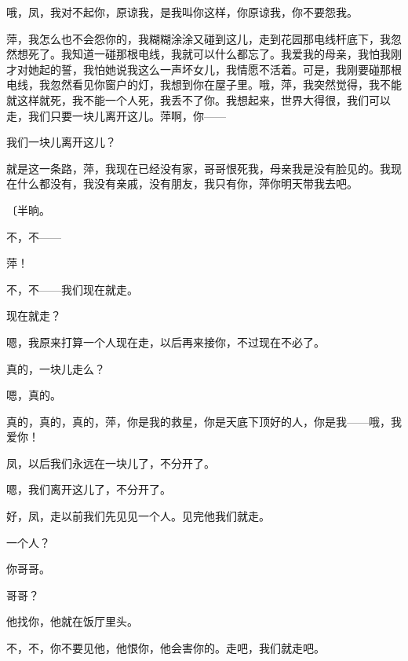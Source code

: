 哦，凤，我对不起你，原谅我，是我叫你这样，你原谅我，你不要怨我。

萍，我怎么也不会怨你的，我糊糊涂涂又碰到这儿，走到花园那电线杆底下，我忽然想死了。我知道一碰那根电线，我就可以什么都忘了。我爱我的母亲，我怕我刚才对她起的誓，我怕她说我这么一声坏女儿，我情愿不活着。可是，我刚要碰那根电线，我忽然看见你窗户的灯，我想到你在屋子里。哦，萍，我突然觉得，我不能就这样就死，我不能一个人死，我丢不了你。我想起来，世界大得很，我们可以走，我们只要一块儿离开这儿。萍啊，你——

我们一块儿离开这儿？

就是这一条路，萍，我现在已经没有家，哥哥恨死我，母亲我是没有脸见的。我现在什么都没有，我没有亲戚，没有朋友，我只有你，萍你明天带我去吧。

{\fangsong〔半晌。}

不，不——

萍！

不，不——我们现在就走。

现在就走？

嗯，我原来打算一个人现在走，以后再来接你，不过现在不必了。

真的，一块儿走么？

嗯，真的。

真的，真的，真的，萍，你是我的救星，你是天底下顶好的人，你是我——哦，我爱你！

凤，以后我们永远在一块儿了，不分开了。

嗯，我们离开这儿了，不分开了。

好，凤，走以前我们先见见一个人。见完他我们就走。

一个人？

你哥哥。

哥哥？

他找你，他就在饭厅里头。

不，不，你不要见他，他恨你，他会害你的。走吧，我们就走吧。

